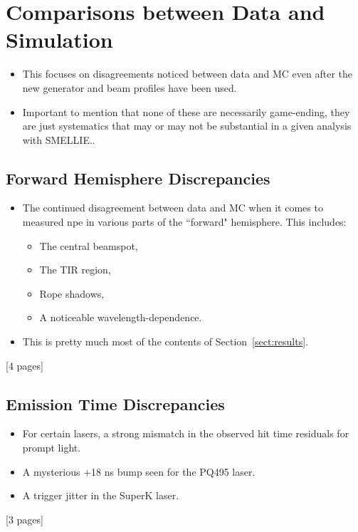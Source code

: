 \section{Comparisons between Data and Simulation}
{
    \color{blue}
    \begin{itemize}
        \item This focuses on disagreements noticed between data and MC even after the new generator and beam profiles have been used.
        \item Important to mention that none of these are necessarily game-ending, they are just systematics that may or may not be substantial in a given analysis with SMELLIE..
    \end{itemize}
    
    \subsection{Forward Hemisphere Discrepancies}
    \begin{itemize}
        \item The continued disagreement between data and MC when it comes to measured npe in various parts of the ``forward" hemisphere. This includes:
        \begin{itemize}
            \item The central beamspot,
            \item The TIR region,
            \item Rope shadows,
            \item A noticeable wavelength-dependence.
        \end{itemize}
        \item This is pretty much most of the contents of Section~\ref{sect:results}.
    \end{itemize}
    [4 pages]
    
    \subsection{Emission Time Discrepancies}
    \begin{itemize}
        \item For certain lasers, a strong mismatch in the observed hit time residuals for prompt light.
        \item A mysterious +18 ns bump seen for the PQ495 laser.
        \item A trigger jitter in the SuperK laser.
    \end{itemize}
    [3 pages]
}
